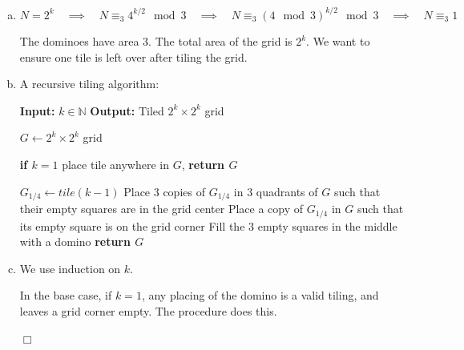 \documentclass[10pt]{article}
\newenvironment{proof}{\par\noindent{\it Proof.}\hspace*{1em}}{$\Box$\bigskip}
\begin{document}
\begin{solution}

    \begin{enumerate}[(a)]
        \item {
            $N = 2^k 
            \quad \implies \quad 
            N \equiv_3 4^{k/2} \mod 3 
            \quad \implies  \quad 
            N \equiv_3 (4 \mod 3)^{k/2} \mod 3
            \quad \implies  \quad 
            N \equiv_3 1
            $

            The dominoes have area 3. 
            The total area of the grid is $2^k$. 
            We want to ensure one tile is left over after tiling the grid. 
        }

        \item {

            A recursive tiling algorithm:

            \begin{algorithm}
                \caption{$tile(k)$}
                \begin{algorithmic}[1]
                    \Statex \textbf{Input:} $k \in \mathbb{N}$
                    \Statex \textbf{Output:} Tiled $2^k \times 2^k$ grid
                    
                    \State $G \gets 2^k \times 2^k$ grid

                    \State \textbf{if $k=1$} place tile anywhere in $G$, \textbf{return $G$}

                    \State $G_{1/4} \gets tile(k-1)$
                    \State Place 3 copies of $G_{1/4}$ in 3 quadrants of $G$ such that their empty squares are in the grid center
                    \State Place a copy of $G_{1/4}$ in $G$ such that its empty square is on the grid corner
                    \State Fill the 3 empty squares in the middle with a domino
                    \State \textbf{return $G$}

                \end{algorithmic}
            \end{algorithm}
        
        }
        
        \item {
            \begin{proof}

                We use induction on $k$. 

                In the base case, if $k=1$, any placing of the domino is a valid tiling, 
                and leaves a grid corner empty. The procedure does this. 


\end{proof}}
\end{enumerate}
\end{solution}
\end{document}

